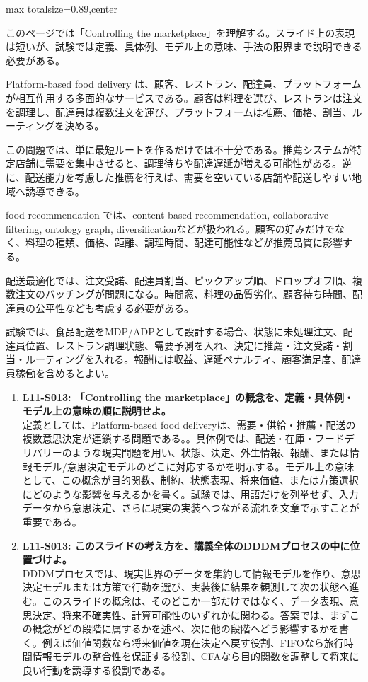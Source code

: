 \begin{minipage}[t]{0.58\textwidth}
\begin{adjustbox}{max totalsize={\textwidth}{0.89\textheight},center}
\begin{minipage}{\textwidth}\scriptsize
{}このページでは「Controlling the marketplace」を理解する。スライド上の表現は短いが、試験では定義、具体例、モデル上の意味、手法の限界まで説明できる必要がある。\par
Platform-based food delivery は、顧客、レストラン、配達員、プラットフォームが相互作用する多面的なサービスである。顧客は料理を選び、レストランは注文を調理し、配達員は複数注文を運び、プラットフォームは推薦、価格、割当、ルーティングを決める。\par
この問題では、単に最短ルートを作るだけでは不十分である。推薦システムが特定店舗に需要を集中させると、調理待ちや配達遅延が増える可能性がある。逆に、配送能力を考慮した推薦を行えば、需要を空いている店舗や配送しやすい地域へ誘導できる。\par
food recommendation では、content-based recommendation, collaborative filtering, ontology graph, diversificationなどが扱われる。顧客の好みだけでなく、料理の種類、価格、距離、調理時間、配達可能性などが推薦品質に影響する。\par
配送最適化では、注文受諾、配達員割当、ピックアップ順、ドロップオフ順、複数注文のバッチングが問題になる。時間窓、料理の品質劣化、顧客待ち時間、配達員の公平性なども考慮する必要がある。\par
試験では、食品配送をMDP/ADPとして設計する場合、状態に未処理注文、配達員位置、レストラン調理状態、需要予測を入れ、決定に推薦・注文受諾・割当・ルーティングを入れる。報酬には収益、遅延ペナルティ、顧客満足度、配達員稼働を含めるとよい。\par{}\begin{enumerate}\item \textbf{L11-S013: 「Controlling the marketplace」の概念を、定義・具体例・モデル上の意味の順に説明せよ。}\\定義としては、Platform-based food deliveryは、需要・供給・推薦・配送の複数意思決定が連鎖する問題である。。具体例では、配送・在庫・フードデリバリーのような現実問題を用い、状態、決定、外生情報、報酬、または情報モデル/意思決定モデルのどこに対応するかを明示する。モデル上の意味として、この概念が目的関数、制約、状態表現、将来価値、または方策選択にどのような影響を与えるかを書く。試験では、用語だけを列挙せず、入力データから意思決定、さらに現実の実装へつながる流れを文章で示すことが重要である。\item \textbf{L11-S013: このスライドの考え方を、講義全体のDDDMプロセスの中に位置づけよ。}\\DDDMプロセスでは、現実世界のデータを集約して情報モデルを作り、意思決定モデルまたは方策で行動を選び、実装後に結果を観測して次の状態へ進む。このスライドの概念は、そのどこか一部だけではなく、データ表現、意思決定、将来不確実性、計算可能性のいずれかに関わる。答案では、まずこの概念がどの段階に属するかを述べ、次に他の段階へどう影響するかを書く。例えば価値関数なら将来価値を現在決定へ戻す役割、FIFOなら旅行時間情報モデルの整合性を保証する役割、CFAなら目的関数を調整して将来に良い行動を誘導する役割である。\end{enumerate}

\end{minipage}
\end{adjustbox}
\end{minipage}
